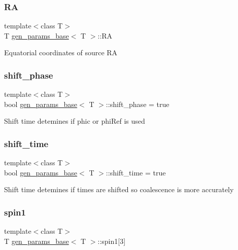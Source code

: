\subsubsection{\texorpdfstring{RA}{RA}}
{\footnotesize\ttfamily template$<$class T$>$ \\
T \hyperlink{classgen__params__base}{gen\+\_\+params\+\_\+base}$<$ T $>$\+::RA}

Equatorial coordinates of source RA \mbox{\label{classgen__params__base_a8753041140d91176f966b5f8dfc7de34}} 
\subsubsection{\texorpdfstring{shift\+\_\+phase}{shift\_phase}}
{\footnotesize\ttfamily template$<$class T$>$ \\
bool \hyperlink{classgen__params__base}{gen\+\_\+params\+\_\+base}$<$ T $>$\+::shift\+\_\+phase = true}

Shift time detemines if phic or phi\+Ref is used \mbox{\label{classgen__params__base_adebbc3e4955f322fde2c9ac61f3f61e8}} 
\subsubsection{\texorpdfstring{shift\+\_\+time}{shift\_time}}
{\footnotesize\ttfamily template$<$class T$>$ \\
bool \hyperlink{classgen__params__base}{gen\+\_\+params\+\_\+base}$<$ T $>$\+::shift\+\_\+time = true}

Shift time detemines if times are shifted so coalescence is more accurately \mbox{\label{classgen__params__base_a42e83426b899a1b9c987101433943a02}} 
\subsubsection{\texorpdfstring{spin1}{spin1}}
{\footnotesize\ttfamily template$<$class T$>$ \\
T \hyperlink{classgen__params__base}{gen\+\_\+params\+\_\+base}$<$ T $>$\+::spin1\mbox{[}3\mbox{]}}

